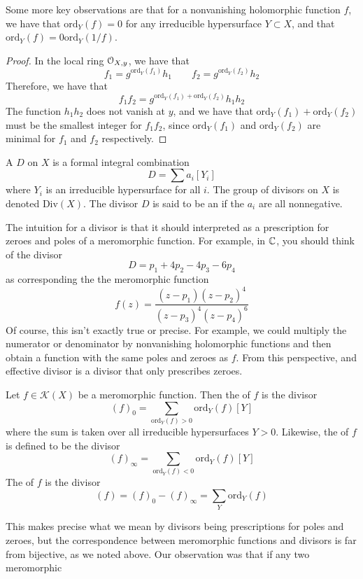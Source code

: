 %
Some more key observations are that for a nonvanishing holomorphic function $f$, we have
that $\mathrm{ord}_Y(f) = 0$ for any irreducible hypersurface $Y \subset X$, and
that $\mathrm{ord}_Y(f) = 0 \mathrm{ord}_Y(1/f)$.
%
\begin{proof}
In the local ring $\mathcal{O}_{X,y}$, we have that
\[
f_1 = g^{\mathrm{ord}_Y(f_1)}h_1 \qquad f_2 = g^{\mathrm{ord}_Y(f_2)}h_2
\]
Therefore, we have that
\[
f_1f_2 = g^{\mathrm{ord}_Y(f_1) + \mathrm{ord}_Y(f_2)}h_1h_2
\]
The function $h_1h_2$ does not vanish at $y$, and we have that
$\mathrm{ord}_Y(f_1) + \mathrm{ord}_Y(f_2)$ must be the smallest integer for
$f_1f_2$, since $\mathrm{ord}_Y(f_1)$ and $\mathrm{ord}_Y(f_2)$ are minimal for
$f_1$ and $f_2$ respectively.
\end{proof}
%
\begin{defn}
A  $D$ on $X$ is a formal integral combination
\[
D = \sum a_i[Y_i]
\]
where $Y_i$ is an irreducible hypersurface for all $i$. The group of divisors on
$X$ is denoted $\mathrm{Div}(X)$. The divisor $D$ is said to be an
 if the $a_i$ are all nonnegative.
\end{defn}
%
The intuition for a divisor is that it should interpreted as a prescription for zeroes
and poles of a meromorphic function. For example, in $\mathbb{C}$, you should think of
the divisor
\[
D = p_1 + 4p_2 - 4p_3 - 6p_4
\]
as corresponding the the meromorphic function
\[
f(z) = \frac{(z-p_1)(z-p_2)^4}{(z-p_3)^4(z-p_4)^6}
\]
Of course, this isn't exactly true or precise. For example, we could multiply the
numerator or denominator by nonvanishing holomorphic functions and then obtain a function
with the same poles and zeroes as $f$. From this perspective, and effective
divisor is a divisor that only prescribes zeroes.
%
\begin{defn}
Let $f \in \mathcal{K}(X)$ be a meromorphic function. Then the  of
$f$ is the divisor
\[
(f)_0 = \sum_{\mathrm{ord}_Y(f) > 0} \mathrm{ord}_Y(f)[Y]
\]
where the sum is taken over all irreducible hypersurfaces $Y > 0$. Likewise, the
 of $f$ is defined to be the divisor
\[
(f)_\infty = \sum_{\mathrm{ord}_Y(f) < 0} \mathrm{ord}_Y(f)[Y]
\]
The  of $f$ is the divisor
\[
(f) = (f)_0 - (f)_\infty = \sum_Y \mathrm{ord}_Y(f)
\]
\end{defn}
%
This makes precise what we mean by divisors being prescriptions for poles and
zeroes, but the correspondence between meromorphic functions and divisors is
far from bijective, as we noted above. Our observation was that if any two meromorphic

